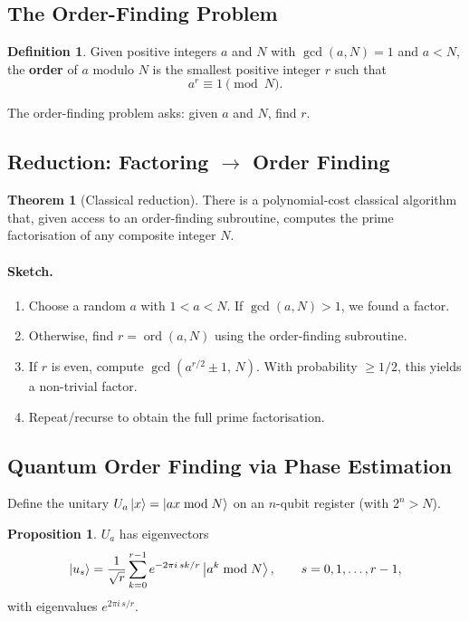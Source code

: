 \documentclass[11pt]{article}
\theoremstyle{definition}
\newtheorem{definition}{Definition}[section]
\newtheorem{proposition}{Proposition}[section]
\newtheorem{theorem}{Theorem}[section]
\begin{document}
\subsection{The Order-Finding Problem}

\begin{definition}
Given positive integers $a$ and $N$ with $\gcd(a,N)=1$ and $a<N$, the \textbf{order} of $a$ modulo $N$ is the smallest positive integer $r$ such that
\[
    a^r \equiv 1 \pmod{N}.
\]
\end{definition}

The order-finding problem asks: given $a$ and $N$, find $r$.

\subsection{Reduction: Factoring $\to$ Order Finding}

\begin{theorem}[Classical reduction]
There is a polynomial-cost classical algorithm that, given access to an order-finding subroutine, computes the prime factorisation of any composite integer $N$.
\end{theorem}

\paragraph{Sketch.}
\begin{enumerate}
    \item Choose a random $a$ with $1<a<N$.  If $\gcd(a,N)>1$, we found a factor.
    \item Otherwise, find $r=\operatorname{ord}(a,N)$ using the order-finding subroutine.
    \item If $r$ is even, compute $\gcd(a^{r/2}\pm 1,\,N)$.  With probability $\ge 1/2$, this yields a non-trivial factor.
    \item Repeat/recurse to obtain the full prime factorisation.
\end{enumerate}

\subsection{Quantum Order Finding via Phase Estimation}

Define the unitary $U_a\ket{x} = \ket{ax\bmod N}$ on an $n$-qubit register (with $2^n > N$).

\begin{proposition}
$U_a$ has eigenvectors
\[
    \ket{u_s} = \frac{1}{\sqrt{r}}\sum_{k=0}^{r-1}e^{-2\pi i\,sk/r}\ket{a^k\bmod N},
    \qquad s=0,1,\dots,r-1,
\]
with eigenvalues $e^{2\pi i\,s/r}$.
\end{proposition}
\end{document}
